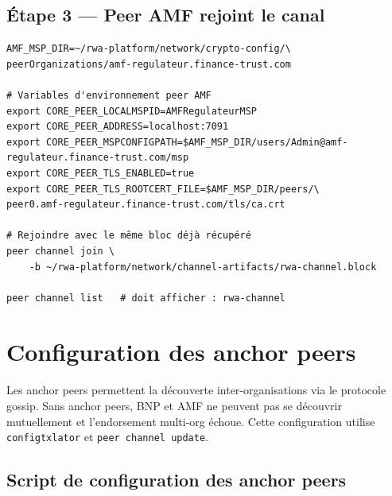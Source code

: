 \documentclass[12pt,a4paper,french]{article}
\begin{document}
\subsection{Étape 3 — Peer AMF rejoint le canal}

\begin{lstlisting}[style=bash, caption={Faire rejoindre le peer AMF}]
AMF_MSP_DIR=~/rwa-platform/network/crypto-config/\
peerOrganizations/amf-regulateur.finance-trust.com

# Variables d'environnement peer AMF
export CORE_PEER_LOCALMSPID=AMFRegulateurMSP
export CORE_PEER_ADDRESS=localhost:7091
export CORE_PEER_MSPCONFIGPATH=$AMF_MSP_DIR/users/Admin@amf-regulateur.finance-trust.com/msp
export CORE_PEER_TLS_ENABLED=true
export CORE_PEER_TLS_ROOTCERT_FILE=$AMF_MSP_DIR/peers/\
peer0.amf-regulateur.finance-trust.com/tls/ca.crt

# Rejoindre avec le même bloc déjà récupéré
peer channel join \
    -b ~/rwa-platform/network/channel-artifacts/rwa-channel.block

peer channel list   # doit afficher : rwa-channel
\end{lstlisting}

\section{Configuration des anchor peers}

\begin{infobox}
Les anchor peers permettent la découverte inter-organisations via le protocole gossip.
Sans anchor peers, BNP et AMF ne peuvent pas se découvrir mutuellement et l'endorsement
multi-org échoue. Cette configuration utilise \texttt{configtxlator} et
\texttt{peer channel update}.
\end{infobox}

\subsection{Script de configuration des anchor peers}
\end{document}

